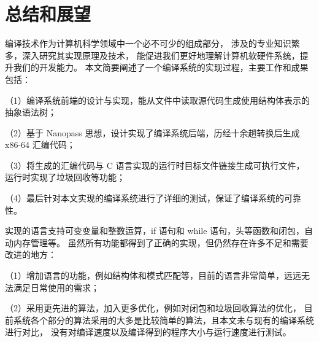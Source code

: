 
\chapter{总结和展望}

编译技术作为计算机科学领域中一个必不可少的组成部分，
涉及的专业知识繁多，深入研究其实现原理及技术，
能促进我们更好地理解计算机软硬件系统，提升我们的开发能力。
本文简要阐述了一个编译系统的实现过程，主要工作和成果包括：

（1）编译系统前端的设计与实现，能从文件中读取源代码生成使用结构体表示的抽象语法树；

（2）基于 Nanopass 思想，设计实现了编译系统后端，历经十余趟转换后生成 x86-64 汇编代码；

（3）将生成的汇编代码与 C 语言实现的运行时目标文件链接生成可执行文件，
运行时实现了垃圾回收等功能；

（4）最后针对本文实现的编译系统进行了详细的测试，保证了编译系统的可靠性。

实现的语言支持可变变量和整数运算，if 语句和 while 语句，头等函数和闭包，自动内存管理等。
虽然所有功能都得到了正确的实现，但仍然存在许多不足和需要改进的地方：

（1）增加语言的功能，例如结构体和模式匹配等，目前的语言非常简单，远远无法满足日常使用的需求；

（2）采用更先进的算法，加入更多优化，例如对闭包和垃圾回收算法的优化，
目前系统各个部分的算法采用的大多是比较简单的算法，且本文未与现有的编译系统进行对比，
没有对编译速度以及编译得到的程序大小与运行速度进行测试。
